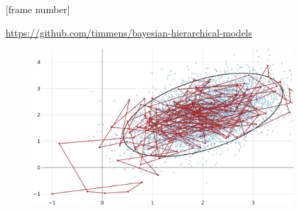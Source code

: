 \documentclass[serif, mathsansserif]{beamer}
\title{\raggedright\selectfont{\color{black}\textls[200]{\uppercase{Bayesian\\Hierarchical\\Models}}}}
\author{\raggedright\selectfont{\color{black}\textls[200]{Linda Maokomatanda\\Tim Mensinger\\Markus Schick}}}
\institute{\raggedright\selectfont\large\textls{University of Bonn}}
\date{}
\begin{document}
\begin{frame}
    \titlepage
\end{frame}

\begin{frame}
  \tableofcontents
\end{frame}
\setcounter{framenumber}{0}






[frame number]{}
\begin{frame}[noframenumbering]
  \vfill
  \centering
  \huge \url{https://github.com/timmens/bayesian-hierarchical-models}
  \vfill
\end{frame}

\begin{frame}[noframenumbering]
  \centering
  \begin{figure}
    \includegraphics[height=6cm]{graphics/toy-mcmc-with-all-samples.pdf}
  \end{figure}
\end{frame}

%
%
\end{document}

